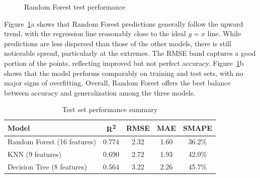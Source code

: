 \begin{figure}[!ht]
    \centering
    \hfill
    \caption{Random Forest test performance}
    \caption*{\hspace{1em}}
    \label{fig:rf_results}
\end{figure}
\FloatBarrier

Figure~\ref{fig:rf_results}a shows that Random Forest predictions generally follow the upward trend, with the regression line reasonably close to the ideal $y = x$ line. While predictions are less dispersed than those of the other models, there is still noticeable spread, particularly at the extremes. The RMSE band captures a good portion of the points, reflecting improved but not perfect accuracy. Figure~\ref{fig:rf_results}b shows that the model performs comparably on training and test sets, with no major signs of overfitting. Overall, Random Forest offers the best balance between accuracy and generalization among the three models.

\begin{table}[!ht]
    \centering
    \caption{Test set performance summary}
    \label{tab:model_results}
    \begin{tabular}{lcccc}
        \toprule
        \textbf{Model} & \textbf{R\textsuperscript{2}} & \textbf{RMSE} & \textbf{MAE} & \textbf{SMAPE} \\
        \midrule
        Random Forest (16 features) & 0.774 & 2.32 & 1.60 & 36.2\% \\
        KNN (9 features)            & 0.690 & 2.72 & 1.93 & 42.0\% \\
        Decision Tree (8 features)  & 0.564 & 3.22 & 2.26 & 45.7\% \\
        \bottomrule
    \end{tabular}
\end{table}
\FloatBarrier


